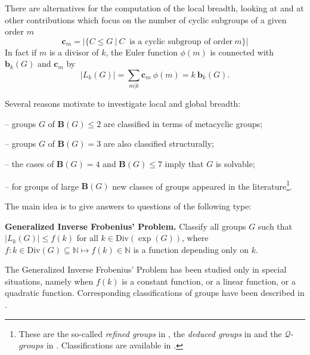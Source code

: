 \documentclass{amsart}
\theoremstyle{definition}
\numberwithin{equation}{section}
\begin{document}
There are alternatives for the  computation of the local breadth, looking at \cite{gp, russo} and at other contributions which focus on the number of cyclic subgroups of a given order   $m$ 
\begin{equation}\label{phi} 
\mathbf{c}_ m= |\{ C\leq G \ |  \ C \ \mbox{ is a cyclic subgroup of order} \ m \}|
\end{equation}
In fact if $m$ is a divisor of $k$,  the  Euler function $\phi(m) $ is connected with $\mathbf{b}_k(G)$ and $\mathbf{c}_m$ by
\begin{equation}\label{phib}
|L_k(G)| = \underset{m|k}{\sum}{\mathbf{c}_m  \ \phi(m)} = k \ \mathbf{b}_k(G).
\end{equation}

Several reasons motivate to investigate  local and global breadth:

\medskip
\medskip
\medskip


-- groups $G$ of $\mathbf{B}(G) \le 2$ are classified in terms of metacyclic groups; 

\medskip

-- groups $G$ of $\mathbf{B}(G)=3$ are also  classified structurally; 

\medskip

-- the cases of $\mathbf{B}(G)=4$ and $ \textbf{B}(G)\leq 7$ imply that $G$ is solvable; 


\medskip

-- for groups of large $\mathbf{B}(G)$  new classes of groups appeared in the literature\footnote{ These are the so-called \textit{refined groups} in \cite[Definition 1.1]{hr3}, the \textit{deduced groups} in \cite[Definition 1.2]{hr3} and  the $\mathcal{Q}$-$groups$ in  \cite[Section 2 ]{hr2}. Classifications are available in \cite{hr1, hr2, hr3, russo}.}.  

\medskip
\medskip
\medskip

The main idea is to give answers to questions of the following type:


\medskip
\medskip

\textbf{Generalized Inverse Frobenius' Problem.} Classify all groups $G$ such that $|L_k(G)| \le f(k)$ for all $k \in \mathrm{Div}(\exp(G))$, where $f : k \in  \mathrm{Div}(G) \subseteq \mathbb{N} \mapsto f(k) \in \mathbb{N}$ is a  function depending only on  $k$.

\medskip
\medskip

The Generalized Inverse Frobenius' Problem has been studied only in special situations, namely when $f(k)$ is a constant function, or a linear function, or a quadratic function. Corresponding classifications of groups have been described in \cite{hr1, hr2, hr3, ms, meng2016, meng2017}. 
\end{document}
